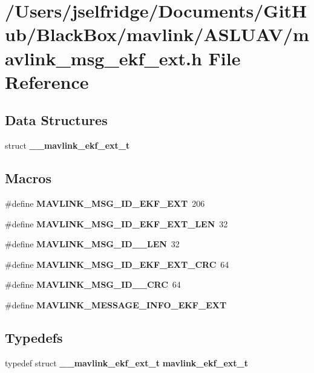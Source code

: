 \section{/\+Users/jselfridge/\+Documents/\+Git\+Hub/\+Black\+Box/mavlink/\+A\+S\+L\+U\+A\+V/mavlink\+\_\+msg\+\_\+ekf\+\_\+ext.h File Reference}
\label{mavlink__msg__ekf__ext_8h}
\subsection*{Data Structures}
\begin{DoxyCompactItemize}
\item 
struct \textbf{ \+\_\+\+\_\+mavlink\+\_\+ekf\+\_\+ext\+\_\+t}
\end{DoxyCompactItemize}
\subsection*{Macros}
\begin{DoxyCompactItemize}
\item 
\#define \textbf{ M\+A\+V\+L\+I\+N\+K\+\_\+\+M\+S\+G\+\_\+\+I\+D\+\_\+\+E\+K\+F\+\_\+\+E\+XT}~206
\item 
\#define \textbf{ M\+A\+V\+L\+I\+N\+K\+\_\+\+M\+S\+G\+\_\+\+I\+D\+\_\+\+E\+K\+F\+\_\+\+E\+X\+T\+\_\+\+L\+EN}~32
\item 
\#define \textbf{ M\+A\+V\+L\+I\+N\+K\+\_\+\+M\+S\+G\+\_\+\+I\+D\+\_\+\_\+\+L\+EN}~32
\item 
\#define \textbf{ M\+A\+V\+L\+I\+N\+K\+\_\+\+M\+S\+G\+\_\+\+I\+D\+\_\+\+E\+K\+F\+\_\+\+E\+X\+T\+\_\+\+C\+RC}~64
\item 
\#define \textbf{ M\+A\+V\+L\+I\+N\+K\+\_\+\+M\+S\+G\+\_\+\+I\+D\+\_\+\_\+\+C\+RC}~64
\item 
\#define \textbf{ M\+A\+V\+L\+I\+N\+K\+\_\+\+M\+E\+S\+S\+A\+G\+E\+\_\+\+I\+N\+F\+O\+\_\+\+E\+K\+F\+\_\+\+E\+XT}
\end{DoxyCompactItemize}
\subsection*{Typedefs}
\begin{DoxyCompactItemize}
\item 
typedef struct \textbf{ \+\_\+\+\_\+mavlink\+\_\+ekf\+\_\+ext\+\_\+t} \textbf{ mavlink\+\_\+ekf\+\_\+ext\+\_\+t}
\end{DoxyCompactItemize}


